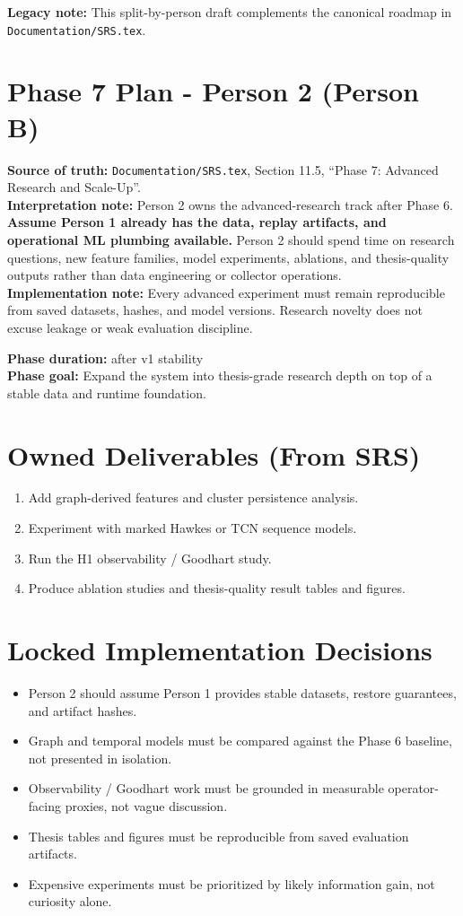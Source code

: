 \documentclass{article}
\begin{document}
\textbf{Legacy note:} This split-by-person draft complements the canonical roadmap in \texttt{Documentation/SRS.tex}.\\

\section*{Phase 7 Plan - Person 2 (Person B)}

\textbf{Source of truth:} \texttt{Documentation/SRS.tex}, Section 11.5, ``Phase 7: Advanced Research and Scale-Up''.\\
\textbf{Interpretation note:} Person 2 owns the advanced-research track after Phase 6. \textbf{Assume Person 1 already has the data, replay artifacts, and operational ML plumbing available.} Person 2 should spend time on research questions, new feature families, model experiments, ablations, and thesis-quality outputs rather than data engineering or collector operations.\\
\textbf{Implementation note:} Every advanced experiment must remain reproducible from saved datasets, hashes, and model versions. Research novelty does not excuse leakage or weak evaluation discipline.

\textbf{Phase duration:} after v1 stability\\
\textbf{Phase goal:} Expand the system into thesis-grade research depth on top of a stable data and runtime foundation.

\section*{Owned Deliverables (From SRS)}
\begin{enumerate}
\item Add graph-derived features and cluster persistence analysis.
\item Experiment with marked Hawkes or TCN sequence models.
\item Run the H1 observability / Goodhart study.
\item Produce ablation studies and thesis-quality result tables and figures.
\end{enumerate}

\section*{Locked Implementation Decisions}
\begin{itemize}
\item Person 2 should assume Person 1 provides stable datasets, restore guarantees, and artifact hashes.
\item Graph and temporal models must be compared against the Phase 6 baseline, not presented in isolation.
\item Observability / Goodhart work must be grounded in measurable operator-facing proxies, not vague discussion.
\item Thesis tables and figures must be reproducible from saved evaluation artifacts.
\item Expensive experiments must be prioritized by likely information gain, not curiosity alone.
\end{itemize}
\end{document}
